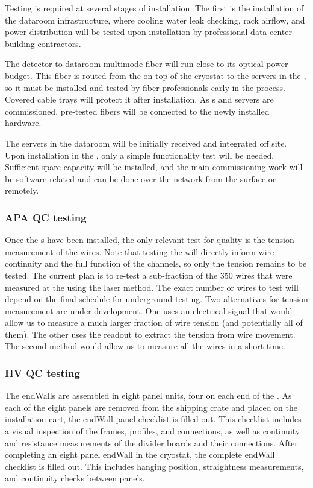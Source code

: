 Testing is required at several stages of  installation.  The first is the installation of the dataroom infrastructure, where cooling water leak checking, rack airflow, and power distribution will be tested upon installation by professional data center building contractors.

The detector-to-dataroom multimode fiber will run close to its optical power budget.  This fiber is routed from the  on top of the cryostat to the servers in the , so it must be installed and tested by fiber professionals early in the process.  Covered cable trays will protect it after installation.  As s and servers are commissioned, pre-tested fibers will be connected to the newly installed hardware.

The  servers in the  dataroom will be initially received and integrated off site.  Upon installation in the , only a simple functionality test will be needed.  Sufficient spare capacity will be installed, and the main commissioning work will be software related and can be done over the network from the surface or remotely.

\subsubsection{APA QC testing}

Once the s have been installed, the only relevant test for  quality is the tension measurement of the wires. 
Note that testing the  will directly inform wire continuity and the full function of the channels, so only the tension remains to be tested. 
The current plan is to re-test a sub-fraction of the 350 wires that were measured at the  using the laser method. 
The exact number or wires to test will depend on the final schedule for underground testing. 
Two alternatives for tension measurement are under development. 
One uses an electrical signal that would allow us to measure a much larger fraction of wire tension (and potentially all of them). 
The other uses the  readout to extract the tension from wire movement. 
The second method would allow us to measure all the wires in a short time.

\subsubsection{HV QC testing}

The endWalls are assembled in eight panel units, four on each end of the .  
As each of the eight panels are removed from the shipping crate and placed on the installation cart, the endWall panel checklist is filled out.\cite{bib:docdb10452}
This checklist includes a visual inspection of the frames, profiles, and connections, as well as continuity and resistance measurements of the divider boards and their connections.  
After completing an eight panel endWall in the cryostat, the complete endWall checklist is filled out.  
This includes hanging position, straightness measurements, and continuity checks between panels.

